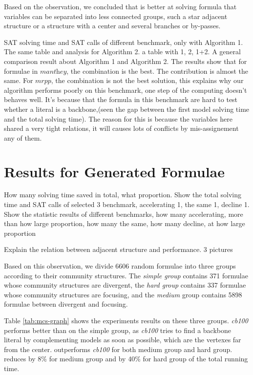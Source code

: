 Based on the observation, we concluded that \tool is better at solving formula that variables can be separated into less connected groups, such a star adjacent structure or a structure with a center and several branches or by-passes.


SAT solving time and SAT calls of different benchmark, only with Algorithm 1.
The same table and analysis for Algorithm 2. a table with 1, 2, 1+2.
A general comparison result about Algorithm 1 and Algorithm 2.
The results show that for formulae in $\textit{manthey}$, the combination is the best. The contribution is almost the same.
For $\textit{mrpp}$, the combination is not the best solution, this explains why our algorithm performs poorly on this benchmark, one step of the computing doesn't behaves well. It's because that the formula in this benchmark are hard to test whether a literal is a backbone,(seen the gap between the first model solving time and the total solving time). The reason for this is because the variables here shared a very tight relations, it will causes lots of conflicts by mis-assignement any of them.

\section{Results for Generated Formulae}
How many solving time saved in total, what proportion.
Show the total solving time and SAT calls of selected 3 benchmark, accelerating 1, the same 1, decline 1.
Show the statistic results of different benchmarks, how many accelerating, more than how large proportion, how many the same, how many decline, at how large proportion

Explain the relation between adjacent structure and performance.
3 pictures

Based on this observation, we divide 6606 random formulae into three groups according to their community structures.
The \emph{simple group} contains 371 formulae whose community structures are divergent,
the \emph{hard group} contains 337 formulae whose community structures are focusing,
and the \emph{medium} group contains 5898 formulae between divergent and focusing.


Table \ref{tab:mcs-graph} shows the experiments results on these three groups. \textit{cb100} performs better than \tool on the simple group, as \textit{cb100} tries to find a backbone literal by complementing models as soon as possible, which are the vertexes far from the center.
\tool outperforms \textit{cb100} for both medium group and hard group.
\tool reduces by 8\% for medium group and by 40\% for hard group of the total running time.

